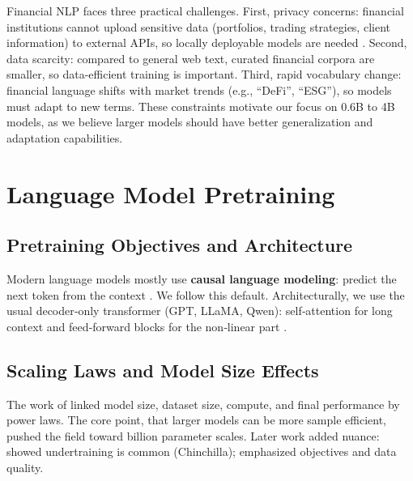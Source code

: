 Financial NLP faces three practical challenges. {First}, privacy concerns: financial institutions cannot upload sensitive data (portfolios, trading strategies, client information) to external APIs, so locally deployable models are needed \parencite{wu2023bloomberggpt}. {Second}, data scarcity: compared to general web text, curated financial corpora are smaller, so data-efficient training is important. {Third}, rapid vocabulary change: financial language shifts with market trends (e.g., ``DeFi'', ``ESG''), so models must adapt to new terms. These constraints motivate our focus on 0.6B to 4B models, as we believe larger models should have better generalization and adaptation capabilities.

\section{Language Model Pretraining}

\subsection{Pretraining Objectives and Architecture}

Modern language models mostly use \textbf{causal language modeling}: predict the next token from the context \parencite{radford2019language, brown2020language}. We follow this default. Architecturally, we use the usual decoder‑only transformer (GPT, LLaMA, Qwen): self‑attention for long context and feed‑forward blocks for the non‑linear part \parencite{vaswani2017attention, touvron2023llama}.

\subsection{Scaling Laws and Model Size Effects}

The work of \textcite{kaplan2020scaling} linked model size, dataset size, compute, and final performance by power laws. The core point, that larger models can be more sample efficient, pushed the field toward billion parameter scales. Later work added nuance: \textcite{hoffmann2022training} showed undertraining is common (Chinchilla); \textcite{tay2022ul2} emphasized objectives and data quality.


